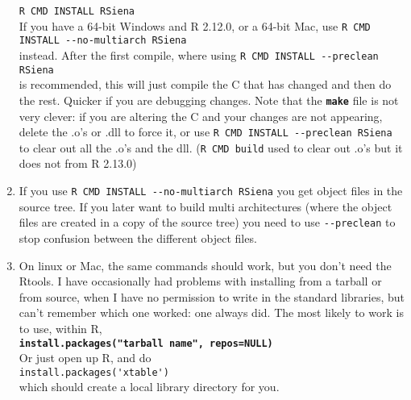 \documentclass[12pt, a4paper]{article}
\renewcommand{\=}{\,=\,}
\newcommand{\+}{\,+\,}
\newcommand{\sfn}[1]{\textbf{\texttt{#1}}}
\begin{document}
\begin{enumerate}
\verb|R CMD INSTALL RSiena|\\
If you have a 64-bit Windows and R 2.12.0, or a 64-bit Mac, use
\verb|R CMD INSTALL --no-multiarch RSiena|\\
instead. After the first compile, where using
\verb|R CMD INSTALL --preclean RSiena| \\is recommended,
this will just compile the C that has changed and then do the rest.
Quicker if you are debugging changes. Note that the \sfn{make} file is not very
clever: if you are altering the C and your changes are not appearing, delete the
.o's or .dll to force it, or use
\verb|R CMD INSTALL --preclean RSiena|\\
to clear out all the .o's and the dll. (\verb|R CMD build| used to clear out
.o's but it does not from R 2.13.0)
\item If you use \verb|R CMD INSTALL --no-multiarch RSiena|
you get object files in the source tree. If you later want to build multi
architectures (where the object files are created in a copy of the source tree)
you need to use \verb|--preclean| to stop confusion between the different object
files.
\item On linux or Mac, the same commands should work, but you don't need the
  Rtools. I have occasionally had problems with installing from a tarball or
  from source, when I have no permission to write in the standard libraries, but
  can't remember which one worked: one always did. The most likely to work is to
  use, within R,\\
 \sfn{install.packages("tarball name", repos=NULL)}\\
 Or just
  open up R, and do \\
\verb|install.packages('xtable')| \\which should create a
  local library directory for you.
\end{enumerate}
\end{document}
